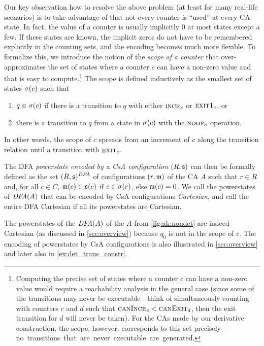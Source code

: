 \documentclass[acmsmall,screen]{acmart}
\begin{document}
Our key observation how to resolve the above problem (at least for many
real-life scenarios) is to take advantage of that not every counter is ``used''
at every CA state. 
%
In fact, the value of a counter is usually implicitly 0 at most states except a
few. 
%
If these states are known, the implicit zeros do not have to be remembered
explicitly in the counting sets, and the encoding becomes much more flexible. 
%
To formalize this, we introduce the notion of the \emph{scope of a counter} that
over-approximates the set of states where a counter $c$ can have a non-zero
value and that is easy to compute.\footnote{Computing the precise set of states
where a counter $c$ can have a non-zero value would require a reachability
analysis in the general case (since some of the transitions may never be
executable---think of simultaneously counting with counters $c$ and $d$ such
that $\CanIncr c < \CanExit d$, then the exit transition for $d$ will never be
taken). For the CAs made by our derivative construction, the scope, however,
corresponds to this set \mbox{precisely---no transitions that are never
executable are generated.}
}
%
The scope is defined inductively as the smallest set of states $\scope(c)$ such
that\begin{enumerate}

  \item $q \in \scope(c)$ if there is a transition to $q$ with either $\IncrOp[c]$
  or $\ExitIncrOp[c]$, or

  \item there is a transition to $q$ from a state in $\scope(c)$ with the
  $\NoOp[c]$ operation.

\end{enumerate} In other words, the scope of $c$ spreads from an increment of
$c$ along the transition relation until a transition with $\ExitOp[c]$.

The DFA \emph{powerstate encoded by a CsA configuration} $(R,\smem)$ can then be
formally defined as the set $\pstateof{(R,\smem)}$ of configurations $(r,\mem)$
of the CA $A$ such that $r\in R$ and, for all $c\in C$, $\mem(c)\in \smem(c)$ if
$c\in\scope(r)$, else $\mem(c) = 0$.
%
We call the powerstates of $\DFAof{A}$ that can be encoded by CsA configurations
\emph{Cartesian}, and call the entire DFA Cartesian if all its
powerstates are Cartesian.

\begin{ex}
The powerstates of the $\DFAof{A}$ of the \CA $A$ from \cref{fig:ak:nondet} are
indeed Cartesian (as discussed in \cref{sec:overview}) because $q_0$ is not in
the scope of $c$.
The encoding of powerstates by CsA configurations is also illustrated in \cref{sec:overview} and later also in \cref{ex:det_trans_constr}.
\end{ex}
\end{document}

